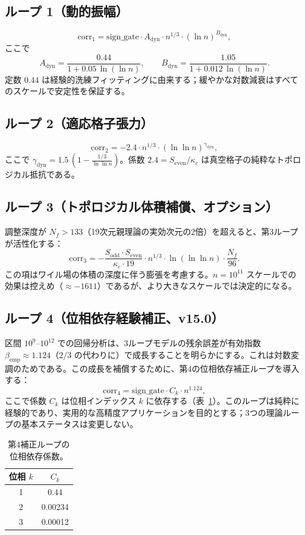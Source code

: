 \documentclass[11pt,a4paper]{article}
\newcommand{\kappac}{\kappa_c}
\newcommand{\Sodd}{S_{\mathrm{odd}}}
\newcommand{\Seven}{S_{\mathrm{even}}}
\begin{document}
	\subsection{ループ 1（動的振幅）}
	\[
	\mathrm{corr}_1 = \mathrm{sign\_gate} \cdot A_{\mathrm{dyn}} \cdot n^{1/3} \cdot (\ln n)^{B_{\mathrm{dyn}}},
	\]
	ここで
	\[
	A_{\mathrm{dyn}} = \frac{0.44}{1 + 0.05\,\ln(\ln n)}, \qquad
	B_{\mathrm{dyn}} = \frac{1.05}{1 + 0.012\,\ln(\ln n)}.
	\]
	定数 \(0.44\) は経験的洗練フィッティングに由来する；緩やかな対数減衰はすべてのスケールで安定性を保証する。
	
	\subsection{ループ 2（適応格子張力）}
	\[
	\mathrm{corr}_2 = -2.4 \cdot n^{1/3} \cdot (\ln\ln n)^{\gamma_{\mathrm{dyn}}},
	\]
	ここで \(\gamma_{\mathrm{dyn}} = 1.5\,(1 - \frac{1/3}{\ln\ln n})\)。係数 \(2.4 = \Seven/\kappac\) は真空格子の純粋なトポロジカル抵抗である。
	
	\subsection{ループ 3（トポロジカル体積補償、オプション）}
	調整深度が \(N_f > 133\)（19次元親理論の実効次元の2倍）を超えると、第3ループが活性化する：
	\[
	\mathrm{corr}_3 = -\frac{\Sodd\cdot\Seven}{\kappac\cdot 19} \cdot n^{1/3} \cdot \ln(\ln\ln n) \cdot \frac{N_f}{96}.
	\]
	この項はワイル場の体積の深度に伴う膨張を考慮する。\(n=10^{11}\) スケールでの効果は控えめ（\(\approx -1611\)）であるが、より大きなスケールでは決定的になる。
	
	\subsection{ループ 4（位相依存経験補正、v15.0）}
	区間 \(10^9\)--\(10^{12}\) での回帰分析は、3ループモデルの残余誤差が有効指数 \(\beta_{\mathrm{emp}} \approx 1.124\)（\(2/3\) の代わりに）で成長することを明らかにする。これは対数変調のためである。この成長を補償するために、第4の位相依存補正ループを導入する：
	\[
	\mathrm{corr}_4 = \mathrm{sign\_gate} \cdot C_k \cdot n^{1.124},
	\]
	ここで係数 \(C_k\) は位相インデックス \(k\) に依存する（表~\ref{tab:phase-coeffs}）。このループは純粋に経験的であり、実用的な高精度アプリケーションを目的とする；3つの理論ループの基本ステータスは変更しない。
	
	\begin{table}[htbp]
		\centering
		\caption{第4補正ループの位相依存係数。}
		\label{tab:phase-coeffs}
		\begin{tabular}{c c}
			\toprule
			位相 \(k\) & \(C_k\) \\
			\midrule
			1 & 0.44 \\
			2 & 0.00234 \\
			3 & 0.00012 \\
			\bottomrule
		\end{tabular}
	\end{table}
	
\end{document}
